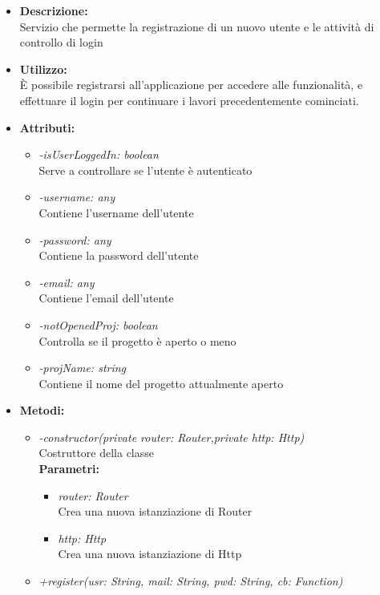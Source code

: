 \begin{itemize}
	\item \textbf{Descrizione:}\\
	Servizio che permette la registrazione di un nuovo utente e le attività di controllo di login
	
	\item \textbf{Utilizzo:}\\
	È possibile registrarsi all’applicazione per accedere alle funzionalità, e effettuare il login per continuare i lavori precedentemente cominciati.
	
	\item \textbf{Attributi:}
		\begin{itemize}
			\item \emph{-isUserLoggedIn: boolean}\\
			Serve a controllare se l'utente è autenticato
			\item \emph{-username: any}\\
			Contiene l'username dell'utente
			\item \emph{-password: any}\\
			Contiene la password dell'utente
			\item \emph{-email: any}\\
			Contiene l'email dell'utente
			\item \emph{-notOpenedProj: boolean}\\
			Controlla se il progetto è aperto o meno
			\item \emph{-projName: string}\\
			Contiene il nome del progetto attualmente aperto
		\end{itemize}
	\item \textbf{Metodi:}
		\begin{itemize}
			\item \emph{-constructor(private router: Router,private http: Http)}\\
    		Costruttore della classe\\
    		\textbf{Parametri:}
    		\begin{itemize}
    			\item \emph{router: Router}\\
    			Crea una nuova istanziazione di Router
    			\item \emph{http: Http}\\
    			Crea una nuova istanziazione di Http
    		\end{itemize}
    		\item \emph{+register(usr: String, mail: String, pwd: String, cb: Function)}\\

\end{itemize}
\end{itemize}
